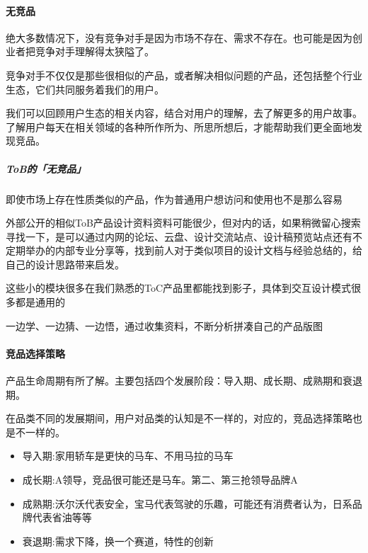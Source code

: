 \documentclass[letterpaper,11pt,english]{sphinxmanual}
\begin{document}
\paragraph{无竞品}
\label{\detokenize{chapter_knowledge/goods_analysis:id19}}
绝大多数情况下，没有竞争对手是因为市场不存在、需求不存在。也可能是因为创业者把竞争对手理解得太狭隘了。

竞争对手不仅仅是那些很相似的产品，或者解决相似问题的产品，还包括整个行业生态，它们共同服务着我们的用户。

我们可以回顾用户生态的相关内容，结合对用户的理解，去了解更多的用户故事。了解用户每天在相关领域的各种所作所为、所思所想后，才能帮助我们更全面地发现竞品。


\subparagraph{ToB的「无竞品」}
\label{\detokenize{chapter_knowledge/goods_analysis:tob}}
即使市场上存在性质类似的产品，作为普通用户想访问和使用也不是那么容易

外部公开的相似ToB产品设计资料资料可能很少，但对内的话，如果稍微留心搜索寻找一下，是可以通过内网的论坛、云盘、设计交流站点、设计稿预览站点还有不定期举办的内部专业分享等，找到前人对于类似项目的设计文档与经验总结的，给自己的设计思路带来启发。

这些小的模块很多在我们熟悉的ToC产品里都能找到影子，具体到交互设计模式很多都是通用的

一边学、一边猜、一边悟，通过收集资料，不断分析拼凑自己的产品版图


\paragraph{竞品选择策略}
\label{\detokenize{chapter_knowledge/goods_analysis:id20}}
产品生命周期有所了解。主要包括四个发展阶段：导入期、成长期、成熟期和衰退期。

在品类不同的发展期间，用户对品类的认知是不一样的，对应的，竞品选择策略也是不一样的。
\begin{itemize}
\item {} 
导入期:家用轿车是更快的马车、不用马拉的马车

\item {} 
成长期:A领导，竞品很可能还是马车。第二、第三抢领导品牌A

\item {} 
成熟期:沃尔沃代表安全，宝马代表驾驶的乐趣，可能还有消费者认为，日系品牌代表省油等等

\item {} 
衰退期:需求下降，换一个赛道，特性的创新

\end{itemize}
\end{document}
